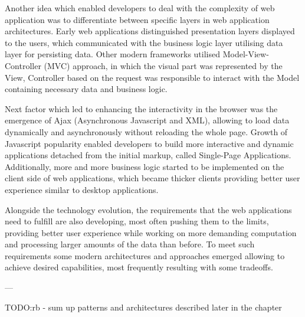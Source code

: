 Another idea which enabled developers to deal with the complexity of web application was to differentiate between specific layers in web application architectures. Early web applications distinguished presentation layers displayed to the users, which communicated with the business logic layer utilising data layer for persisting data. Other modern frameworks utilised Model-View-Controller (MVC) approach, in which the visual part was represented by the View, Controller based on the request was responsible to interact with the Model containing necessary data and business logic.

Next factor which led to enhancing the interactivity in the browser was the emergence of Ajax (Asynchronous Javascript and XML), allowing to load data dynamically and asynchronously without reloading the whole page. Growth of Javascript popularity enabled developers to build more interactive and dynamic applications detached from the initial markup, called Single-Page Applications. Additionally, more and more business logic started to be implemented on the client side of web applications, which became thicker clients providing better user experience similar to desktop applications.

Alongside the technology evolution, the requirements that the web applications need to fulfill are also developing, most often pushing them to the limits, providing better user experience while working on more demanding computation and processing larger amounts of the data than before. To meet such requirements some modern architectures and approaches emerged allowing to achieve desired capabilities, most frequently resulting with some tradeoffs.

---

TODO:rb - sum up patterns and architectures described later in the chapter





